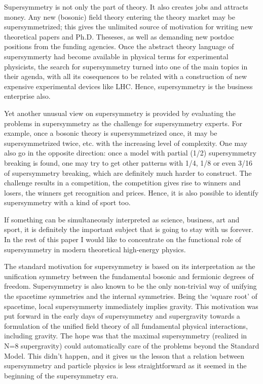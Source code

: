 \documentclass[a4paper,a4paper]{article}
\begin{document}
Supersymmetry is not only the part of theory. It also creates jobs and 
attracts money. Any new (bosonic) field theory entering the theory market may 
be supersymmetrized; this gives the unlimited source of motivation for 
writing new theoretical papers and Ph.D. Theseses, as well as demanding new 
postdoc positions from the funding agencies. Once the abstract theory language
 of supersymmerty had become available in physical terms for experimental 
physicists, the search for supersymmetry turned into one of the main 
topics in their agenda, with all its cosequences to be related with a 
construction of new expensive experimental devices like LHC. Hence, 
supersymmetry is the business enterprise also.

Yet another unusual view on supersymmetry is provided by evaluating the 
problems in supersymmetry as the challenge for supersymmetry experts. 
For example, once a bosonic theory is supersymmetrized once, it may be 
supersymmetrized twice, etc. with the increasing level of complexity. One may
also go in the opposite direction: once a model with partial (1/2) 
supersymmetry breaking is found, one may try to get other patterns with 1/4, 
1/8 or even 3/16 of supersymmetry breaking, which are definitely much harder to
construct. The challenge results in a competition, the competition gives rise 
to winners and losers, the winners get recognition and prices. Hence, it 
is also possible to identify supersymmetry with a kind of sport too.

If something can be simultaneously interpreted as science, business, art and 
sport, it is definitely the important subject that is going to stay with us
forever. In the rest of this paper I would like to concentrate on the 
functional role of supersymmetry in modern theoretical high-energy physics.

The standard motivation for supersymmetry is based on its interpretation as the
unification symmetry between the fundamental bosonic and fermionic degrees of
freedom. Supersymmetry is also known to be the only non-trivial way of 
unifying the spacetime symmetries and the internal symmetries. Being the 
`square root' of spacetime, local supersymmerty immediately implies gravity. 
This motivation was put forward in the early days of supersymmetry and 
supergravity towards a formulation of the unified field theory of all 
fundamental physical interactions, including gravity. The hope was that the 
maximal supersymmetry (realized in N=8 supergravity) could automatically care
 of the problems beyond the Standard Model. This didn't happen, and it gives us
the lesson that a relation between supersymmetry and particle physics is less 
straightforward as it seemed in the beginning of the supersymmetry era.
 
\end{document}
